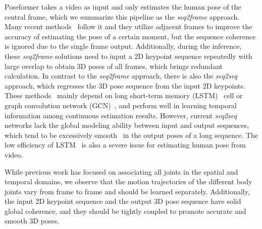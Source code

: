 \documentclass[10pt,twocolumn,letterpaper]{article}
\begin{document}
Poseformer \cite{poseformer} takes a video as input and only estimates the human pose of the central frame, which we summarize this pipeline as the \textit{seq2frame} approach.
Many recent methods~\cite{videopose3d,attentionmechanism,anatomypose,cai2019exploiting,poseformer} follow it and they utilize adjacent frames to improve the accuracy of estimating the pose of a certain moment, but the sequence coherence is ignored due to the single frame output.
Additionally, during the inference, these \textit{seq2frame} solutions need to input a 2D keypoint sequence repeatedly with large overlap to obtain 3D poses of all frames, which brings redundant calculation.
In contrast to the \textit{seq2frame} approach, there is also the \textit{seq2seq} approach, which regresses the 3D pose sequence from the input 2D keypoints.
	These methods~\cite{motionguidepose,temporalconsis} mainly depend on long short-term memory (LSTM)~\cite{lstm} cell or graph convolution network (GCN)~\cite{gcn}, and perform well in learning temporal information among continuous estimation results.
	However, current \textit{seq2seq} networks lack the global modeling ability between input and output sequences, which tend to be excessively smooth~\cite{videopose3d} in the output poses of a long sequence.
	The low efficiency of LSTM~\cite{lstm} is also a severe issue for estimating human pose from video.
	
While previous work has focused on associating all joints in the spatial and temporal domains, we observe that the motion trajectories of the different body joints vary from frame to frame and should be learned separately.
	Additionally, the input 2D keypoint sequence and the output 3D pose sequence have solid global coherence, and they should be tightly coupled to promote accurate and smooth 3D poses.
	
\end{document}
